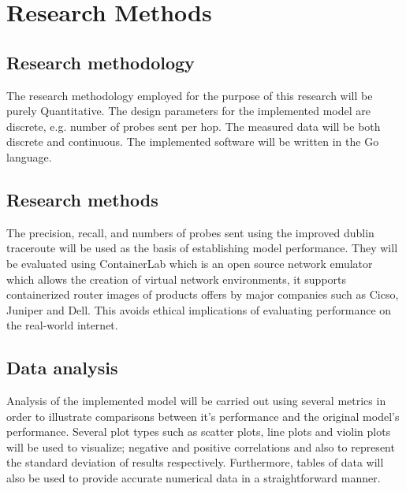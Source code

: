 \section{Research Methods}
\subsection{Research methodology}
The research methodology employed for the purpose of this research will be purely Quantitative. The design parameters for the implemented model are discrete, e.g. number of probes sent per hop. The measured data will be both discrete and continuous. The implemented software will be written in the Go language.


\subsection{Research methods}
The precision, recall, and numbers
of probes sent using the improved dublin traceroute will be used as the basis of establishing model performance. They will be evaluated using ContainerLab \cite{containerlab} which is an open source network emulator which allows the creation of virtual network environments, it supports containerized router images of products offers by major companies such as Cicso, Juniper and Dell. This avoids ethical implications of evaluating performance on the real-world internet. 


\subsection{Data analysis}
Analysis of the implemented model will be carried out using several metrics in order to illustrate comparisons between it's performance and the original model's performance. Several plot types such as scatter plots, line plots and violin plots will be used to visualize; negative and positive correlations and also to represent the standard deviation of results respectively. Furthermore, tables of data will also be used to provide accurate numerical data in a straightforward manner.